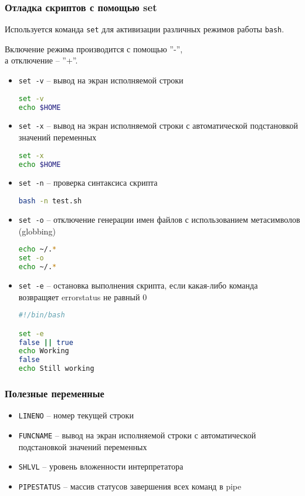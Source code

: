 \begin{frame}
	\frametitle{Отладка скриптов с помощью set}
	
	Используется команда {\tt set} для активизации различных режимов работы {\tt bash}.

	Включение режима производится с помощью ''-'',\\
	а отключение -- ''+''.

	\begin{itemize}
		\item {\tt set -v} -- вывод на экран исполняемой строки
			\begin{lstlisting}[language=sh]
set -v
echo $HOME
			\end{lstlisting}

		\item {\tt set -x} -- вывод на экран исполняемой строки с автоматической подстановкой значений переменных
\begin{lstlisting}[language=sh]
set -x
echo $HOME
\end{lstlisting}

		\item {\tt set -n} -- проверка синтаксиса скрипта
\begin{lstlisting}[language=sh]
bash -n test.sh
\end{lstlisting} 


		\item {\tt set -o} -- отключение генерации имен файлов с использованием метасимволов (globbing)
\begin{lstlisting}[language=sh]
echo ~/.*
set -o
echo ~/.*
\end{lstlisting} 
		\framebreak
		\item {\tt set -e} -- остановка выполнения скрипта, если какая-либо команда 
		возвращяет errorstatus не равный 0
			\begin{lstlisting}[language=sh]
#!/bin/bash

set -e
false || true
echo Working
false
echo Still working
			\end{lstlisting} 
	\end{itemize}
\end{frame}

\begin{frame}[fragile]
	\frametitle{Полезные переменные}

	\begin{itemize}
		\item {\tt LINENO} -- номер текущей строки
		\item {\tt FUNCNAME} -- вывод на экран исполняемой строки с автоматической подстановкой значений переменных
		\item {\tt SHLVL} -- уровень вложенности интерпретатора
		\item {\tt PIPESTATUS} -- массив статусов завершения всех команд в pipe
	\end{itemize}
\end{frame}

